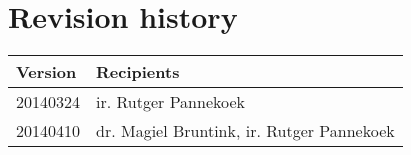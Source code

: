 \chapter*{Revision history}

\begin{tabular}{p{3cm} p{12cm}}
	\hline
	\bfseries{Version} & \bfseries{Recipients} \\
	\hline
	20140324 & ir. Rutger Pannekoek \\
	20140410 & dr. Magiel Bruntink, ir. Rutger Pannekoek \\
	\hline
\end{tabular}
